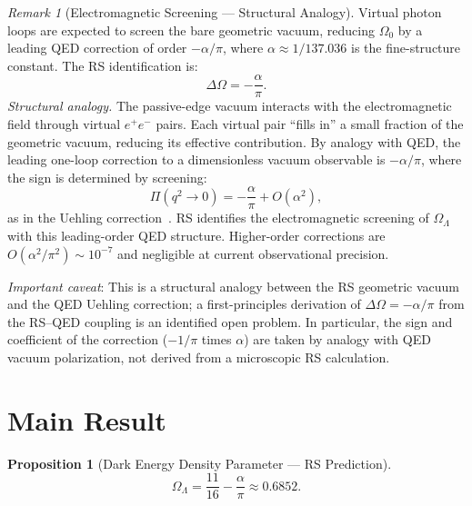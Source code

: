 \documentclass[12pt,a4paper]{article}
\newtheorem{proposition}[theorem]{Proposition}
\theoremstyle{definition}
\theoremstyle{remark}
\newtheorem{remark}[theorem]{Remark}
\begin{document}
\begin{remark}[Electromagnetic Screening --- Structural Analogy]
\label{lem:screening}
Virtual photon loops are expected to screen the bare geometric vacuum,
reducing $\Omega_0$ by a leading QED correction of order
$-\alpha/\pi$, where $\alpha \approx 1/137.036$ is the fine-structure
constant.  The RS identification is:
\begin{equation}
  \Delta\Omega = -\frac{\alpha}{\pi}.
\end{equation}
\emph{Structural analogy.}\;
The passive-edge vacuum interacts with the electromagnetic field
through virtual $e^+e^-$ pairs.  Each virtual pair ``fills in'' a
small fraction of the geometric vacuum, reducing its effective
contribution.  By analogy with QED, the leading one-loop correction
to a dimensionless vacuum observable is $-\alpha/\pi$, where the sign
is determined by screening:
\begin{equation}
  \Pi(q^2 \to 0) = -\frac{\alpha}{\pi} + O(\alpha^2),
\end{equation}
as in the Uehling correction~\cite{Uehling1935}.  RS identifies the
electromagnetic screening of $\Omega_\Lambda$ with this leading-order
QED structure.  Higher-order corrections are $O(\alpha^2/\pi^2)
\sim 10^{-7}$ and negligible at current observational precision.

\emph{Important caveat}: This is a structural analogy between the RS
geometric vacuum and the QED Uehling correction; a first-principles
derivation of $\Delta\Omega = -\alpha/\pi$ from the RS--QED coupling is
an identified open problem.  In particular, the sign and coefficient of the
correction ($-1/\pi$ times $\alpha$) are taken by analogy with QED
vacuum polarization, not derived from a microscopic RS calculation.
\end{remark}

\section{Main Result}
\label{sec:main}

\begin{proposition}[Dark Energy Density Parameter --- RS Prediction]
\label{thm:omega}
\begin{equation}
  \boxed{\Omega_\Lambda = \frac{11}{16} - \frac{\alpha}{\pi}
  \approx 0.6852.}
\end{equation}
\end{proposition}
\end{document}
